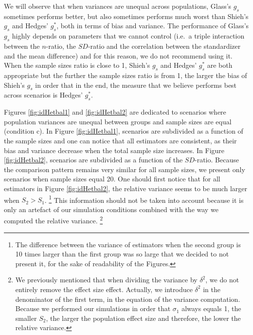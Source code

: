 \documentclass[
  english,
  man,floatsintext]{apa6}
\begin{document}
We will observe that when variances are unequal across populations, Glass's \(g_s\) sometimes performs better, but also sometimes performs much worst than Shieh's \(g_s\) and Hedges' \(g^*_s\), both in terms of bias and variance. The performance of Glass's \(g_s\) highly depends on parameters that we cannot control (i.e.~a triple interaction between the \(n\)-ratio, the \(SD\)-ratio and the correlation between the standardizer and the mean difference) and for this reason, we do not recommend using it. When the sample sizes ratio is close to 1, Shieh's \(g_s\) and Hedges' \(g^*_s\) are both appropriate but the further the sample sizes ratio is from 1, the larger the bias of Shieh's \(g_s\) in order that in the end, the measure that we believe performs best across scenarios is Hedges' \(g^*_s\).

Figures \ref{fig:idHetbal1} and \ref{fig:idHetbal2} are dedicated to scenarios where population variances are unequal between groups and sample sizes are equal (condition c). In Figure \ref{fig:idHetbal1}, scenarios are subdivided as a function of the sample sizes and one can notice that all estimators are consistent, as their bias and variance decrease when the total sample size increases. In Figure \ref{fig:idHetbal2}, scenarios are subdivided as a function of the \(SD\)-ratio. Because the comparison pattern remains very similar for all sample sizes, we present only scenarios when sample sizes equal 20. One should first notice that for all estimators in Figure \ref{fig:idHetbal2}, the relative variance seems to be much larger when \(S_2>S_1\). \footnote{The difference between the variance of estimators when the second group is 10 times larger than the first group was so large that we decided to not present it, for the sake of readability of the Figures.} This information should not be taken into account because it is only an artefact of our simulation conditions combined with the way we computed the relative variance. \footnote{We previously mentioned that when dividing the variance by $\delta^2$, we do not entirely remove the effect size effect. Actually, we introduce $\delta^2$ in the denominator of the first term, in the equation of the variance computation. Because we performed our simulations in order that $\sigma_1$ always equals 1, the smaller $S_2$, the larger the population effect size and therefore, the lower the relative variance.}
\end{document}
